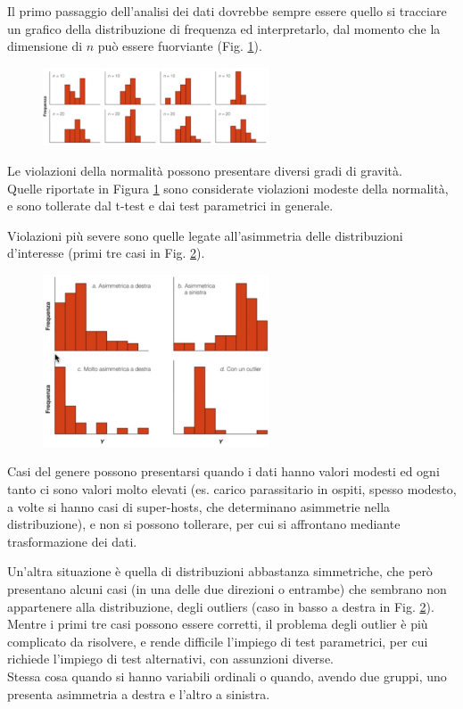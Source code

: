 \documentclass[10pt, draft]{book}
\begin{document}
Il primo passaggio dell'analisi dei dati dovrebbe sempre essere quello si tracciare un grafico della distribuzione di frequenza ed interpretarlo, dal momento che la dimensione di $n$ può essere fuorviante (Fig. \ref{fig13.1-1}).\\
\begin{figure}[H]
    \centering
    \includegraphics[width=0.6\textwidth]{fig13.1-1}
    \caption{\small{}}
    \label{fig13.1-1}
\end{figure}

Le violazioni della normalità possono presentare diversi gradi di gravità.\\
Quelle riportate in Figura \ref{fig13.1-1} sono considerate violazioni modeste della normalità, e sono tollerate dal t-test e dai test parametrici in generale.

Violazioni più severe sono quelle legate all'asimmetria delle distribuzioni d'interesse (primi tre casi in Fig. \ref{fig13.1-2}).\\
\begin{figure}[H]
    \centering
    \includegraphics[width=0.6\textwidth]{fig13.1-2}
    \caption{\small{}}
    \label{fig13.1-2}
\end{figure}

Casi del genere possono presentarsi quando i dati hanno valori modesti ed ogni tanto ci sono valori molto elevati (es. carico parassitario in ospiti, spesso modesto, a volte si hanno casi di super-hosts, che determinano asimmetrie nella distribuzione), e non si possono tollerare, per cui si affrontano mediante trasformazione dei dati.

Un'altra situazione è quella di distribuzioni abbastanza simmetriche, che però presentano alcuni casi (in una delle due direzioni o entrambe) che sembrano non appartenere alla distribuzione, degli outliers (caso in basso a destra in Fig. \ref{fig13.1-2}).\\
Mentre i primi tre casi possono essere corretti, il problema degli outlier è più complicato da risolvere, e rende difficile l'impiego di test parametrici, per cui richiede l'impiego di test alternativi, con assunzioni diverse.\\
Stessa cosa quando si hanno variabili ordinali o quando, avendo due gruppi, uno presenta asimmetria a destra e l'altro a sinistra.
\end{document}
